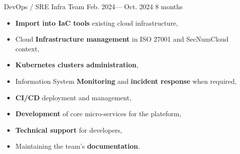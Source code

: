 \jobposition%
{DevOps / SRE}%
{Infra Team}%
{Feb. 2024--- Oct. 2024}%
{8 months}%
{
	\begin{itemize}
	  \item \textbf{Import into IaC tools} existing cloud infrastructure,
		\item Cloud \textbf{Infrastructure management} in ISO 27001 and SecNumCloud
		  context,
		\item \textbf{Kubernetes clusters administration},
		\item Information System \textbf{Monitoring} and \textbf{incident response}
		  when required,
		\item \textbf{CI/CD} deployment and management,
		\item \textbf{Development} of core micro-services for the plateform,
		\item \textbf{Technical support} for developers,
		\item Maintaining the team's \textbf{documentation}.
	\end{itemize}
}
